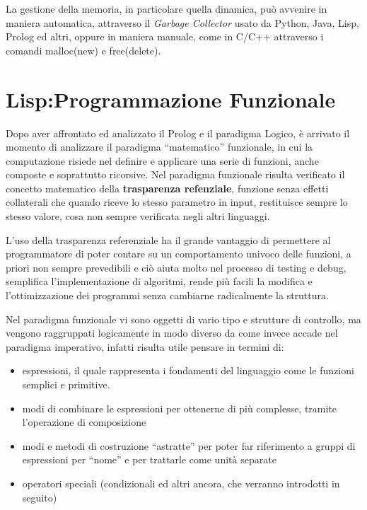 \documentclass[a4paper]{book}
\begin{document}
La gestione della memoria, in particolare quella dinamica, può avvenire in maniera automatica, attraverso il \emph{Garbage Collector}
usato da Python, Java, Lisp, Prolog ed altri, oppure in maniera manuale, come in C/C++ attraverso i comandi malloc(new) e free(delete).


\chapter{Lisp:Programmazione Funzionale}
Dopo aver affrontato ed analizzato il Prolog e il paradigma Logico, è arrivato
il momento di analizzare il paradigma ``matematico'' funzionale,
in cui la computazione risiede nel definire e applicare una serie di funzioni,
anche composte e soprattutto ricorsive.\newline
Nel paradigma funzionale risulta verificato il concetto matematico della \textbf{trasparenza refenziale},
funzione senza effetti collaterali che quando riceve lo stesso parametro in input,
restituisce sempre lo stesso valore, cosa non sempre verificata negli altri linguaggi.

L'uso della trasparenza referenziale ha il grande vantaggio di permettere al programmatore
di poter contare su un comportamento univoco delle funzioni, a priori non sempre prevedibili
e ciò aiuta molto nel processo di testing e debug, semplifica l'implementazione di algoritmi,
rende più facili la modifica e l'ottimizzazione dei programmi senza cambiarne radicalmente la struttura.

Nel paradigma funzionale vi sono oggetti di vario tipo e strutture di controllo, ma vengono raggruppati logicamente in modo diverso
da come invece accade nel paradigma imperativo, infatti risulta utile pensare in termini di:
\begin{itemize}
\item espressioni, il quale rappresenta i fondamenti del linguaggio come le funzioni semplici e primitive.
\item modi di combinare le espressioni per ottenerne di più complesse, tramite l'operazione di composizione
\item modi e metodi di costruzione ``astratte''  per poter far riferimento a gruppi di espressioni per “nome” e per trattarle come unità separate
\item operatori speciali (condizionali ed altri ancora, che verranno introdotti in seguito)
\end{itemize}
\end{document}
